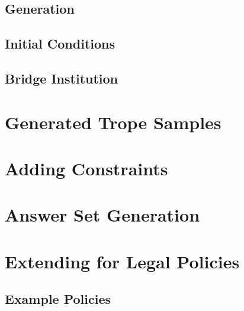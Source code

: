 \subsection{Generation}

\subsection{Initial Conditions}

\subsection{Bridge Institution}

\section{Generated Trope Samples}


\section{Adding Constraints}

\section{Answer Set Generation}

\section{Extending for Legal Policies}

\subsection{Example Policies}

